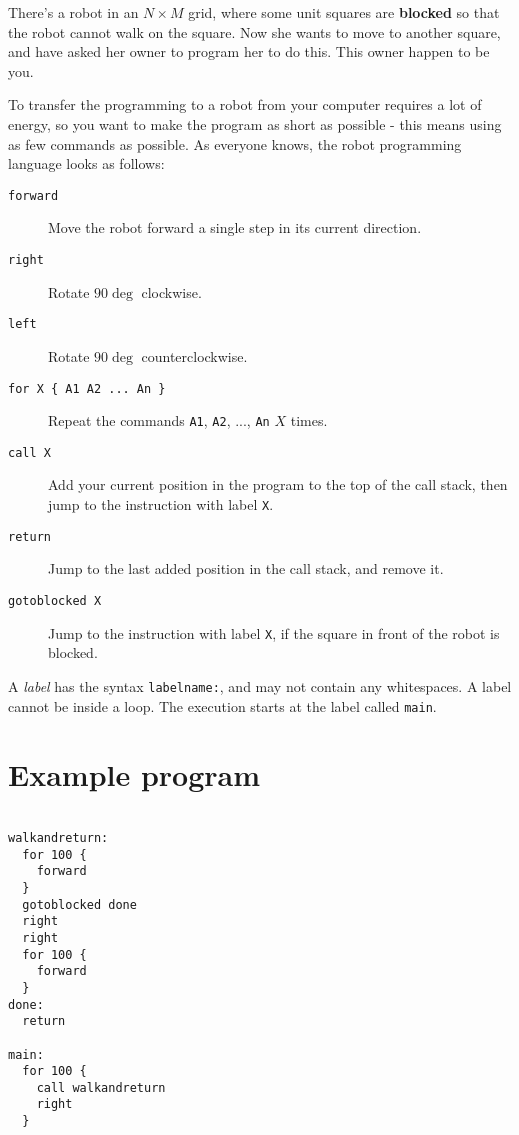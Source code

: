 
There's a robot in an $N \times M$ grid, where some unit squares are \textbf{blocked} so that the robot cannot walk on the square. Now she wants to move to another square, and have asked her owner to program her to do this.
This owner happen to be you.

To transfer the programming to a robot from your computer requires a lot of energy, so you want to make the program as short as possible - this means using as few commands as possible.
As everyone knows, the robot programming language looks as follows:

\begin{description}
  \item[\texttt{forward}] Move the robot forward a single step in its current direction.
  \item[\texttt{right}] Rotate $90\deg$ clockwise.
  \item[\texttt{left}] Rotate $90\deg$ counterclockwise.
  \item[\texttt{for X \{ A1 A2 ... An \}}] Repeat the commands \texttt{A1}, \texttt{A2}, ..., \texttt{An} $X$ times.
  \item[\texttt{call X}] Add your current position in the program to the top of the call stack, then jump to the instruction with label \texttt{X}.
  \item[\texttt{return}] Jump to the last added position in the call stack, and remove it.
  \item[\texttt{gotoblocked X}] Jump to the instruction with label \texttt{X}, if the square in front of the robot is blocked.
\end{description}

A \emph{label} has the syntax \texttt{labelname:}, and may not contain any whitespaces. A label cannot be inside a loop. The execution starts at the label called \texttt{main}.

\section*{Example program}

\begin{verbatim}

walkandreturn:
  for 100 {
    forward
  }
  gotoblocked done
  right
  right
  for 100 {
    forward
  }
done:
  return

main:
  for 100 {
    call walkandreturn
    right
  }
\end{verbatim}

